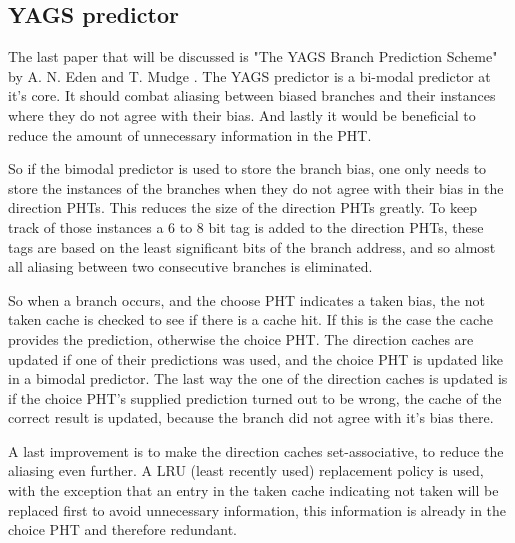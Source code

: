 \subsection{YAGS predictor}
The last paper that will be discussed is "The YAGS Branch Prediction Scheme" by A. N. Eden and T. Mudge \cite{yags}.
The YAGS predictor is a bi-modal predictor at it's core.
It should combat aliasing between biased branches and their instances where they do not agree with their bias.
And lastly it would be beneficial to reduce the amount of unnecessary information in the PHT.

So if the bimodal predictor is used to store the branch bias, one only needs to store the instances of the branches when they do not agree with their bias in the direction PHTs.
This reduces the size of the direction PHTs greatly.
To keep track of those instances a 6 to 8 bit tag is added to the direction PHTs, these tags are based on the least significant bits of the branch address, and so almost all aliasing between two consecutive branches is eliminated.

So when a branch occurs, and the choose PHT indicates a taken bias, the not taken cache is checked to see if there is a cache hit.
If this is the case the cache provides the prediction, otherwise the choice PHT.
The direction caches are updated if one of their predictions was used, and the choice PHT is updated like in a bimodal predictor.
The last way the one of the direction caches is updated is if the choice PHT's supplied prediction turned out to be wrong, the cache of the correct result is updated, because the branch did not agree with it's bias there.

A last improvement is to make the direction caches set-associative, to reduce the aliasing even further.
A LRU (least recently used) replacement policy is used, with the exception that an entry in the taken cache indicating not taken will be replaced first to avoid unnecessary information, this information is already in the choice PHT and therefore redundant.